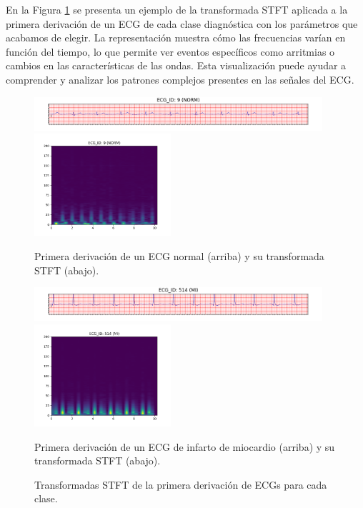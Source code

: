 En la Figura \ref{fig:stft} se presenta un ejemplo de la transformada STFT aplicada a la primera derivación de un ECG de cada clase diagnóstica con los parámetros que acabamos de elegir. La representación muestra cómo las frecuencias varían en función del tiempo, lo que permite ver eventos específicos como arritmias o cambios en las características de las ondas. Esta visualización puede ayudar a comprender y analizar los patrones complejos presentes en las señales del ECG.

\begin{figure}[t]
	\centering
	\includegraphics[width=0.95\textwidth]{Imagenes/Vectorial/Transformadas/NORM/ecg.png}
	\includegraphics[width=0.45\textwidth]{Imagenes/Vectorial/Transformadas/NORM/stft.png}
	\par Primera derivación de un ECG normal (arriba) y su transformada STFT (abajo).
	\vspace{1cm}
	
	\includegraphics[width=0.95\textwidth]{Imagenes/Vectorial/Transformadas/MI/ecg.png}
	\includegraphics[width=0.45\textwidth]{Imagenes/Vectorial/Transformadas/MI/stft.png}
	\par Primera derivación de un ECG de infarto de miocardio (arriba) y su transformada STFT (abajo).
	\caption{Transformadas STFT de la primera derivación de ECGs para cada clase.}
	\label{fig:stft}
\end{figure}
